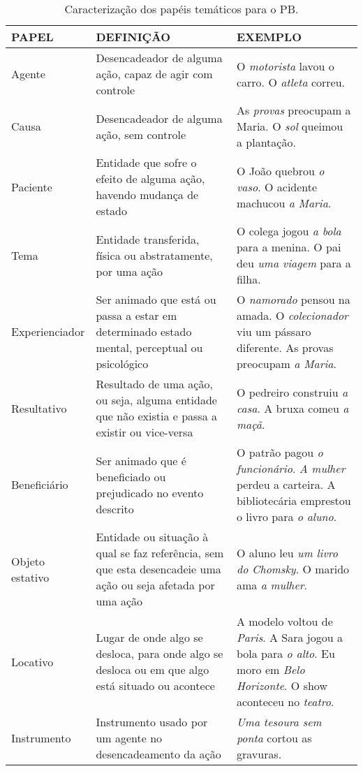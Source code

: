 \begin{table}[htpb]
  \centering
  \footnotesize
  \begin{threeparttable}
  \caption{Caracterização dos papéis temáticos para o PB.}
  \label{tab-01}
  \begin{tabular}{
  >{\raggedright\arraybackslash}p{} 
  >{\raggedright\arraybackslash}p{} 
  >{\raggedright\arraybackslash}p{}}
    \toprule
    PAPEL & DEFINIÇÃO & EXEMPLO \\
    \midrule
    Agente & Desencadeador de alguma ação, capaz de agir com controle & O \emph{motorista} lavou o carro. O \emph{atleta} correu. \\
    Causa & Desencadeador de alguma ação, sem controle & As \emph{provas} preocupam a Maria. O \emph{sol} queimou a plantação. \\
    Paciente & Entidade que sofre o efeito de alguma ação, havendo mudança de estado & O João quebrou \emph{o vaso}. O acidente machucou \emph{a Maria}. \\
    Tema & Entidade transferida, física ou abstratamente, por uma ação & O colega jogou \emph{a bola} para a menina. O pai deu \emph{uma viagem} para a filha. \\
    Experienciador & Ser animado que está ou passa a estar em determinado estado mental, perceptual ou psicológico & O \emph{namorado} pensou na amada. O \emph{colecionador} viu um pássaro diferente. As provas preocupam \emph{a Maria}. \\
    Resultativo & Resultado de uma ação, ou seja, alguma entidade que não existia e passa a existir ou vice-versa & O pedreiro construiu \emph{a casa}. A bruxa comeu \emph{a maçã}. \\
    Beneficiário & Ser animado que é beneficiado ou prejudicado no evento descrito & O patrão pagou \emph{o funcionário}. \emph{A mulher} perdeu a carteira. A bibliotecária emprestou o livro para \emph{o aluno}. \\
    Objeto estativo & Entidade ou situação à qual se faz referência, sem que esta desencadeie uma ação ou seja afetada por uma ação & O aluno leu \emph{um livro do Chomsky}. O marido ama \emph{a mulher}. \\
    Locativo & Lugar de onde algo se desloca, para onde algo se desloca ou em que algo está situado ou acontece & A modelo voltou de \emph{Paris}. A Sara jogou a bola para \emph{o alto}. Eu moro em \emph{Belo Horizonte}. O show aconteceu no \emph{teatro}. \\
    Instrumento & Instrumento usado por um agente no desencadeamento da ação & \emph{Uma tesoura sem ponta} cortou as gravuras. \\
    \bottomrule
  \end{tabular}
  \end{threeparttable}
\end{table}

